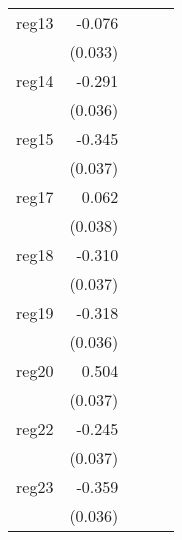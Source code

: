 {\begin{longtable}{l*{4}{D{.}{.}{-1}}}
\addlinespace
reg13       &      -0.076\sym{*}  &                     &                     &                     \\
            &     (0.033)         &                     &                     &                     \\
\addlinespace
reg14       &      -0.291\sym{***}&                     &                     &                     \\
            &     (0.036)         &                     &                     &                     \\
\addlinespace
reg15       &      -0.345\sym{***}&                     &                     &                     \\
            &     (0.037)         &                     &                     &                     \\
\addlinespace
reg17       &       0.062         &                     &                     &                     \\
            &     (0.038)         &                     &                     &                     \\
\addlinespace
reg18       &      -0.310\sym{***}&                     &                     &                     \\
            &     (0.037)         &                     &                     &                     \\
\addlinespace
reg19       &      -0.318\sym{***}&                     &                     &                     \\
            &     (0.036)         &                     &                     &                     \\
\addlinespace
reg20       &       0.504\sym{***}&                     &                     &                     \\
            &     (0.037)         &                     &                     &                     \\
\addlinespace
reg22       &      -0.245\sym{***}&                     &                     &                     \\
            &     (0.037)         &                     &                     &                     \\
\addlinespace
reg23       &      -0.359\sym{***}&                     &                     &                     \\
            &     (0.036)         &                     &                     &                     \\

\end{longtable}}
